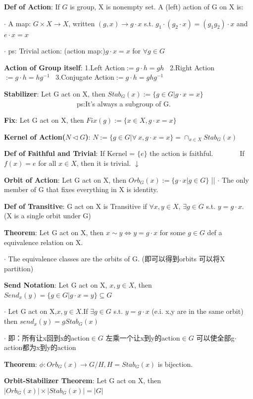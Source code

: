 \documentclass[11pt]{article}
\begin{document}
\textbf{Def of Action}: If $G$ is group, X is nonempty set. A (left) action of G on X is:

$\cdot$ A map: $G\times X\to X$, written $(g,x)\to g\cdot x$ s.t. $g_1\cdot(g_2\cdot x)=(g_1g_2)\cdot x$ and $e\cdot x=x$

$\cdot$ ps: Trivial action: (action map:)$g\cdot x=x$ for $\forall g\in G$

\textbf{Action of Group itself}: 1.Left Action$:=g\cdot h=gh$ \ 2.Right Action$:=g\cdot h=hg^{-1}$ \ 3.Conjugate Action$:=g\cdot h=ghg^{-1}$

\textbf{Stabilizer}: Let G act on X, then $Stab_G(x):=\{g\in G|g\cdot x= x\}$ \ \ \ \ \ \ \ \ \ \ \ \ \ \ \ \ \ \ \ \ \ ps:It's always a subgroup of G.

\textbf{Fix}: Let G act on X, then $Fix(g):=\{x\in X,g\cdot x=x\}$

\textbf{Kernel of Action($N\lhd G$)}: $N:=\{g\in G|\forall \ x,g\cdot x=x\}=\cap_{x\in X} Stab_G(x)$

\textbf{Def of Faithful and Trivial}: If Kernel = $\{e\}$ the action is faithful. \ \ \ \ \ \ \ If $f(x)=e$ for all $x\in X$, then it is trivial. $\downarrow$

\textbf{Orbit of Action}: Let G act on X, then $Orb_G(x):=\{g\cdot x|g\in G\}$ || {\footnotesize $\cdot$ The only member of G that fixes everything in X is identity}.

\textbf{Def of Transitive}: G act on X is Transitive if $\forall x,y\in X$, $\exists g\in G$ s.t. $y=g\cdot x$. (X is a single orbit under G)

\textbf{Theorem}: Let G act on X, then $x\sim y\Leftrightarrow y=g\cdot x$ for some $g\in G$ def a equivalence relation on X.

$\cdot$ The equivalence classes are the orbits of G. (即可以得到orbits 可以将X partition)

\textbf{Send Notation}: Let G act on X, $x,y\in X$, then $Send_x(y)=\{g\in G|g\cdot x=y\}\subseteq G$

$\cdot$ Let G act on X,$x,y\in X$.If $\exists g\in G$ s.t. $y=g\cdot x$ (e.i. x,y are in the same orbit) then $send_x(y)=g Stab_G(x)$

$\cdot$ 即：所有让x回到x的action$\in G$ 左乘一个让x到y的action$\in G$ 可以使全部g$\cdot$action都为x到y的action

\textbf{Theorem}: $\phi:Orb_G(x)\to G/H,H=Stab_G(x)$ is bijection.

\textbf{Orbit-Stabilizer Theorem}: Let G act on X, then $|Orb_G(x)|\times|Stab_G(x)|=|G|$
\end{document}
